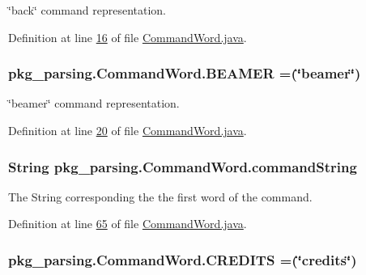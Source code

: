 \char`\"{}back\char`\"{} command representation. 



Definition at line \hyperlink{CommandWord_8java_source_l00016}{16} of file \hyperlink{CommandWord_8java_source}{Command\-Word.\-java}.

\hypertarget{enumpkg__parsing_1_1CommandWord_a4d1c3647eaf81664624ed5effc590be4}{
\subsubsection[{B\-E\-A\-M\-E\-R}]{\setlength{\rightskip}{0pt plus 5cm}pkg\-\_\-parsing.\-Command\-Word.\-B\-E\-A\-M\-E\-R =(\char`\"{}beamer\char`\"{})}}\label{enumpkg__parsing_1_1CommandWord_a4d1c3647eaf81664624ed5effc590be4}


\char`\"{}beamer\char`\"{} command representation. 



Definition at line \hyperlink{CommandWord_8java_source_l00020}{20} of file \hyperlink{CommandWord_8java_source}{Command\-Word.\-java}.

\hypertarget{enumpkg__parsing_1_1CommandWord_a2def2bcb3d7c2e973ad357341f4bd5b3}{
\subsubsection[{command\-String}]{\setlength{\rightskip}{0pt plus 5cm}String pkg\-\_\-parsing.\-Command\-Word.\-command\-String\hspace{0.3cm}{\ttfamily [private]}}}\label{enumpkg__parsing_1_1CommandWord_a2def2bcb3d7c2e973ad357341f4bd5b3}


The String corresponding the the first word of the command. 



Definition at line \hyperlink{CommandWord_8java_source_l00065}{65} of file \hyperlink{CommandWord_8java_source}{Command\-Word.\-java}.

\hypertarget{enumpkg__parsing_1_1CommandWord_a4267a564de4d81cec28764b1eeb3ce22}{
\subsubsection[{C\-R\-E\-D\-I\-T\-S}]{\setlength{\rightskip}{0pt plus 5cm}pkg\-\_\-parsing.\-Command\-Word.\-C\-R\-E\-D\-I\-T\-S =(\char`\"{}credits\char`\"{})}}\label{enumpkg__parsing_1_1CommandWord_a4267a564de4d81cec28764b1eeb3ce22}


